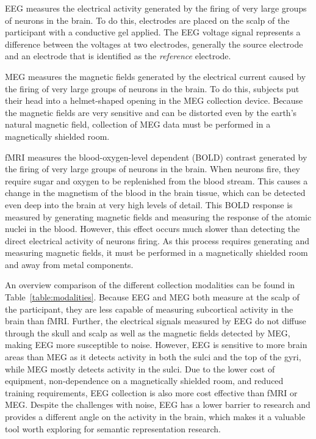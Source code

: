 EEG measures the electrical activity generated by the firing of very large 
groups of neurons in the brain. To do this, electrodes are placed on the scalp 
of the participant with a conductive gel applied. The EEG voltage signal 
represents a difference between the voltages at two electrodes, generally the 
source electrode and an electrode that is identified as the \emph{reference} 
electrode.

MEG measures the magnetic fields generated by the electrical current caused by 
the firing of very large groups of neurons in the brain. To do this, subjects 
put their head into a helmet-shaped opening in the MEG collection device. 
Because the magnetic fields are very sensitive and can be distorted even by the 
earth's natural magnetic field, collection of MEG data must be performed in a 
magnetically shielded room.

fMRI measures the blood-oxygen-level dependent (BOLD) contrast generated by the 
firing of very large groups of neurons in the brain. When neurons fire, they 
require sugar and oxygen to be replenished from the blood stream. This causes a 
change in the magnetism of the blood in the brain tissue, which can be detected 
even deep into the brain at very high levels of detail. This BOLD response is 
measured by generating magnetic fields and measuring the response of the atomic 
nuclei in the blood. However, this effect occurs much slower than detecting the 
direct electrical activity of neurons firing. As this process requires 
generating and measuring magnetic fields, it must be performed in a 
magnetically shielded room and away from metal components.

An overview comparison of the different collection modalities can be found in 
Table~\ref{table:modalities}. Because EEG and MEG both measure at the scalp of 
the participant, they are less capable of measuring subcortical activity in the 
brain than fMRI. Further, the electrical signals measured by EEG do not diffuse 
through the skull and scalp as well as the magnetic fields detected by MEG, 
making EEG more susceptible to noise. However, EEG is sensitive to more brain 
areas than MEG as it detects activity in both the sulci and the top of the 
gyri, while MEG mostly detects activity in the sulci. Due to the lower cost of 
equipment, non-dependence on a magnetically shielded room, and reduced training 
requirements, EEG collection is also more cost effective than fMRI or MEG.  
Despite the challenges with noise, EEG has a lower barrier to research and 
provides a different angle on the activity in the brain, which makes it a 
valuable tool worth exploring for semantic representation research. 

